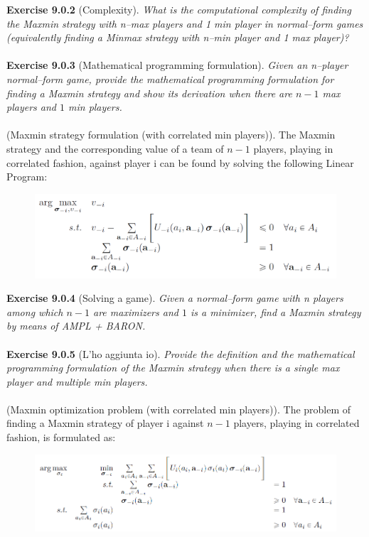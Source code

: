 \noindent
\textbf{Exercise 9.0.2} (Complexity). \textit{What is the computational complexity of finding the Maxmin strategy with n–max players and 1 min player in normal–form games (equivalently finding a Minmax strategy with n–min player and 1 max player)?}\\\\
\textbf{Exercise 9.0.3} (Mathematical programming formulation). \textit{Given an n–player normal–form game, provide the mathematical programming formulation for finding a Maxmin strategy and show its derivation when there are $ n-1 $ max players and $ 1 $ min players.}\\\\
(Maxmin strategy formulation (with correlated min players)). The Maxmin strategy and the corresponding value of a team of $n-1$ players, playing in correlated fashion, against player i can be found by solving the following Linear Program:
\begin{figure}[H]
\centering
\includegraphics[width=\textwidth]{images/img_2_9_03.png}
\end{figure}
\noindent
\textbf{Exercise 9.0.4} (Solving a game). \textit{Given a normal–form game with n players among which $ n-1 $ are maximizers and $ 1 $ is a minimizer, find a Maxmin strategy by means of AMPL + BARON.}\\\\
\textbf{Exercise 9.0.5} (L’ho aggiunta io). \textit{Provide the definition and the mathematical programming formulation of the Maxmin strategy when there is a single max player and multiple min players.}\\\\
(Maxmin optimization problem (with correlated min players)). The problem of finding a Maxmin strategy of player i against $n-1$ players, playing in correlated fashion, is formulated as:
\begin{figure}[H]
\centering
\includegraphics[width=\textwidth]{images/img_2_9_04.png}
\end{figure}

